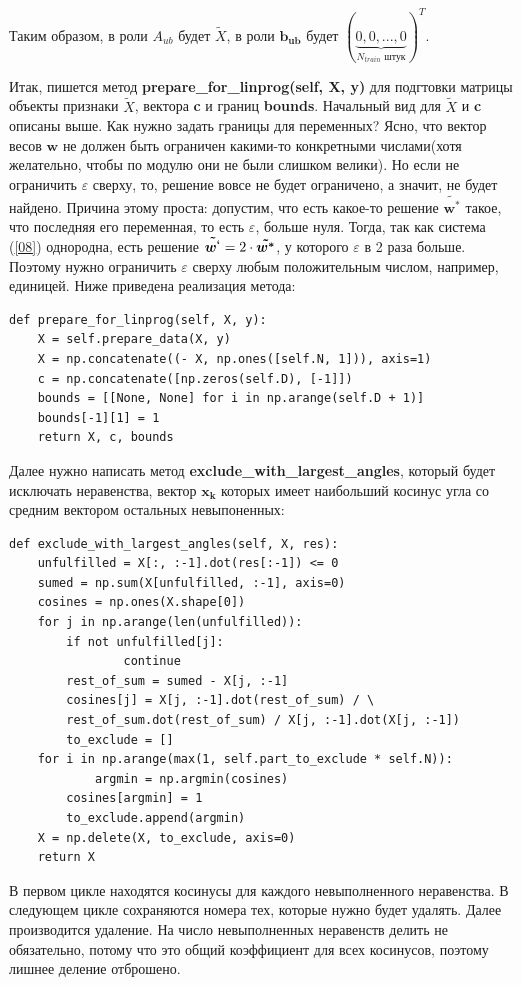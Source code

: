 \documentclass[a4paper]{article}
\newcommand{\w}{\bm{w}}
\newcommand{\xk}{\bm{x_k}}
\begin{document}
Таким образом, в роли $A_{ub}$ будет $\tilde{X}$, в роли $\bm{b_{ub}}$ будет $(\underbrace{0, 0, ..., 0}_\text{$N_{train}$ штук})^T$.

Итак, пишется метод \textbf{prepare\_for\_linprog(self, X, y)} для подгтовки матрицы объекты признаки $\tilde{X}$, вектора \textbf{c} и границ \textbf{bounds}. Начальный вид для $\tilde{X}$ и \textbf{c} описаны выше. Как нужно задать границы для переменных? Ясно, что вектор весов $\w$ не должен быть ограничен какими-то конкретными числами(хотя желательно, чтобы по модулю они не были слишком велики). Но если не ограничить $\varepsilon$ сверху, то, решение вовсе не будет ограничено, а значит, не будет найдено. Причина этому проста: допустим, что есть какое-то решение $\bm{\tilde{w^*}}$ такое, что последняя его переменная, то есть $\varepsilon$, больше нуля. Тогда, так как система (\ref{08}) однородна, есть решение $\bm{\tilde{w^`}} = 2 \cdot \bm{\tilde{w^*}}$, у которого $\varepsilon$ в 2 раза больше. Поэтому нужно ограничить $\varepsilon$ сверху любым положительным числом, например, единицей. Ниже приведена реализация метода:
\begin{lstlisting}
def prepare_for_linprog(self, X, y):
	X = self.prepare_data(X, y)
	X = np.concatenate((- X, np.ones([self.N, 1])), axis=1)
	c = np.concatenate([np.zeros(self.D), [-1]])
	bounds = [[None, None] for i in np.arange(self.D + 1)]
	bounds[-1][1] = 1
	return X, c, bounds
\end{lstlisting}

Далее нужно написать метод \textbf{exclude\_with\_largest\_angles}, который будет исключать неравенства, вектор $\xk$ которых имеет наибольший косинус угла со средним вектором остальных невыпоненных:
\begin{lstlisting}
def exclude_with_largest_angles(self, X, res):
	unfulfilled = X[:, :-1].dot(res[:-1]) <= 0
	sumed = np.sum(X[unfulfilled, :-1], axis=0)
	cosines = np.ones(X.shape[0])
	for j in np.arange(len(unfulfilled)):
		if not unfulfilled[j]:
    			continue
		rest_of_sum = sumed - X[j, :-1]
		cosines[j] = X[j, :-1].dot(rest_of_sum) / \
		rest_of_sum.dot(rest_of_sum) / X[j, :-1].dot(X[j, :-1])
		to_exclude = []
	for i in np.arange(max(1, self.part_to_exclude * self.N)):
    		argmin = np.argmin(cosines)
		cosines[argmin] = 1
		to_exclude.append(argmin)
	X = np.delete(X, to_exclude, axis=0)
	return X
\end{lstlisting}

В первом цикле находятся косинусы для каждого невыполненного неравенства. В следующем цикле сохраняются номера тех, которые нужно будет удалять. Далее производится удаление. На число невыполненных неравенств делить не обязательно, потому что это общий коэффициент для всех косинусов, поэтому лишнее деление отброшено.
\end{document}
